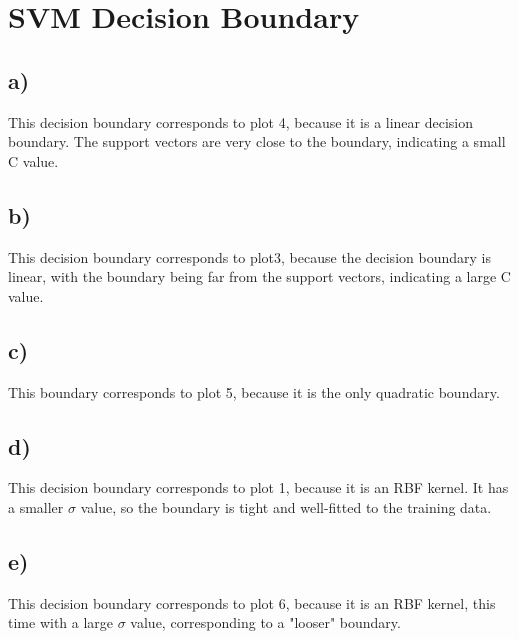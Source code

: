 \documentclass[12pt, letterpaper]{article}
\begin{document}
\newpage
\section{SVM Decision Boundary}
\subsection*{a)} This decision boundary corresponds to plot 4, because it is a linear decision boundary. The support vectors are very close to the boundary, indicating a small C value.

\subsection*{b)} This decision boundary corresponds to plot3, because the decision boundary is linear, with the boundary being far from the support vectors, indicating a large C value.

\subsection*{c)} This boundary corresponds to plot 5, because it is the only quadratic boundary.

\subsection*{d)} This decision boundary corresponds to plot 1, because it is an RBF kernel. It has a smaller $\sigma$ value, so the boundary is tight and well-fitted to the training data.

\subsection*{e)} This decision boundary corresponds to plot 6, because it is an RBF kernel, this time with a large $\sigma$ value, corresponding to a "looser" boundary.
\end{document}
